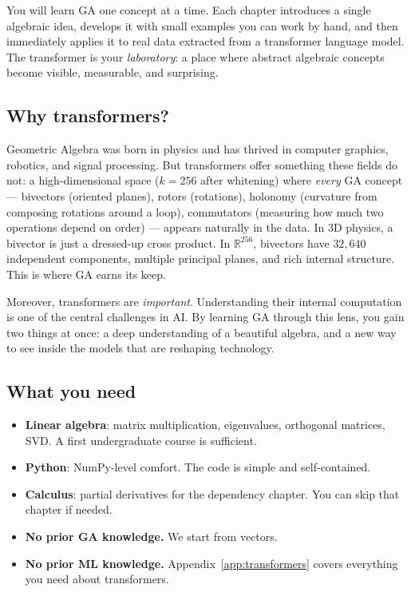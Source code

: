\documentclass[11pt, twoside, openright]{memoir}
\begin{document}
You will learn GA one concept at a time.  Each chapter introduces a single
algebraic idea, develops it with small examples you can work by hand, and
then immediately applies it to real data extracted from a transformer
language model.  The transformer is your \emph{laboratory}: a place where
abstract algebraic concepts become visible, measurable, and surprising.

\subsection*{Why transformers?}

Geometric Algebra was born in physics and has thrived in computer graphics,
robotics, and signal processing.  But transformers offer something these
fields do not: a high-dimensional space ($k = 256$ after whitening) where
\emph{every} GA concept --- bivectors (oriented planes), rotors (rotations), holonomy (curvature from composing rotations around a loop), commutators (measuring how much two operations depend on order) ---
appears naturally in the data.  In 3D physics, a bivector is just a
dressed-up cross product.  In $\mathbb{R}^{256}$, bivectors have
$32{,}640$ independent components, multiple principal planes, and rich
internal structure.  This is where GA earns its keep.

Moreover, transformers are \emph{important}.  Understanding their internal
computation is one of the central challenges in AI.  By learning GA
through this lens, you gain two things at once: a deep understanding of
a beautiful algebra, and a new way to see inside the models that are
reshaping technology.

\subsection*{What you need}

\begin{itemize}[nosep]
\item \textbf{Linear algebra}: matrix multiplication, eigenvalues,
  orthogonal matrices, SVD.  A first undergraduate course is sufficient.
\item \textbf{Python}: NumPy-level comfort.  The code is simple and
  self-contained.
\item \textbf{Calculus}: partial derivatives for the dependency chapter.
  You can skip that chapter if needed.
\item \textbf{No prior GA knowledge.}  We start from vectors.
\item \textbf{No prior ML knowledge.}  Appendix~\ref{app:transformers}
  covers everything you need about transformers.
\end{itemize}
\end{document}
